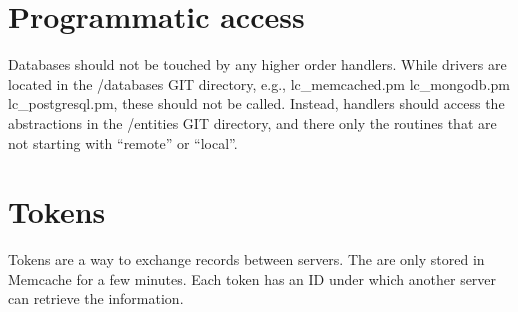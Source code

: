 \section{Programmatic access}
Databases should not be touched by any higher order handlers. While drivers are located in the /databases GIT directory, e.g., lc\_memcached.pm  lc\_mongodb.pm  lc\_postgresql.pm, these should not be called. Instead, handlers should access the abstractions in the /entities GIT directory, and there only the routines that are not starting with ``remote'' or ``local''.

\section{Tokens}\label{token}
Tokens are a way to exchange records between servers. The are only stored in Memcache for a few minutes. Each token has an ID under which another server can retrieve the information.

